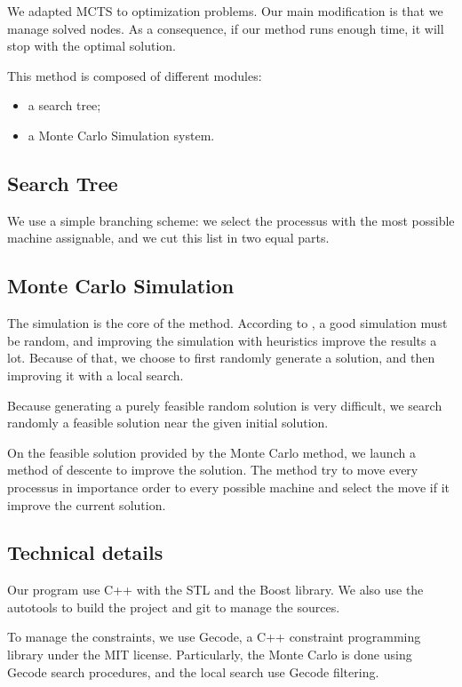 \documentclass[a4paper,twocolumn]{article}
\begin{document}
We adapted MCTS to optimization problems. Our main modification is
that we manage solved nodes.  As a consequence, if our method runs
enough time, it will stop with the optimal solution.

This method is composed of different modules:
\begin{itemize}
\item a search tree;
\item a Monte Carlo Simulation system.
\end{itemize}

\subsection{Search Tree}

We use a simple branching scheme: we select the processus with the
most possible machine assignable, and we cut this list in two equal
parts.

\subsection{Monte Carlo Simulation}

The simulation is the core of the method.  According to
\cite{gelly2007contribution}, a good simulation must be random, and
improving the simulation with heuristics improve the results a lot.
Because of that, we choose to first randomly generate a solution, and
then improving it with a local search.

Because generating a purely feasible random solution is very
difficult, we search randomly a feasible solution near the given
initial solution.

On the feasible solution provided by the Monte Carlo method, we launch
a method of descente to improve the solution.  The method try to move
every processus in importance order to every possible machine and
select the move if it improve the current solution.

\subsection{Technical details}

Our program use C++ with the STL and the Boost library.  We also use
the autotools to build the project and git to manage the sources.

To manage the constraints, we use Gecode, a C++ constraint programming
library under the MIT license.  Particularly, the Monte Carlo is done
using Gecode search procedures, and the local search use Gecode
filtering.
\end{document}
